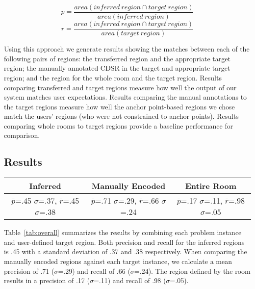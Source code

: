 \begin{equation}
	p=\frac{area(inferred\ region \cap target\ region)}{area(inferred\ region)}
\end{equation}
\begin{equation}
	r=\frac{area(inferred\ region \cap target\ region)}{area(target\ region)}
\end{equation}

Using this approach we generate results showing the matches between each of the following pairs of regions: the transferred region and the appropriate target region; the manually annotated CDSR in the target and appropriate target region; and the region for the whole room and the target region. 
 Results comparing transferred and target regions measure how well the output of our system matches user expectations. Results comparing the manual annotations to the target regions measure how well the anchor point-based regions we chose match the users' regions (who were not constrained to anchor points). Results comparing whole rooms to target regions provide a baseline performance for comparison. 


\subsection{Results}
\begin{table*}
	\center
\begin{tabular}{|c|c|c|}
\hline
Inferred & Manually Encoded & Entire Room \\
\hline
$\bar{p}$=.45 $\sigma$=.37, $\bar{r}$=.45 $\sigma$=.38 & $\bar{p}$=.71 $\sigma$=.29, $\bar{r}$=.66 $\sigma$=.24  & $\bar{p}$=.17 $\sigma$=.11, $\bar{r}$=.98 $\sigma$=.05  \\
\hline
\end{tabular}
\caption{Overall Performance}
  \label{tab:overall}	

\end{table*}


Table~\ref{tab:overall} summarizes the results by combining each problem instance and user-defined target region. Both precision and recall for the inferred regions is .45 with a standard deviation of .37 and .38 respectively. When comparing the manually encoded regions against each target instance, we calculate a mean precision of .71 ($\sigma$=.29) and recall of .66 ($\sigma$=.24). The region defined by the room results in a precision of .17 ($\sigma$=.11) and recall of .98 ($\sigma$=.05).

